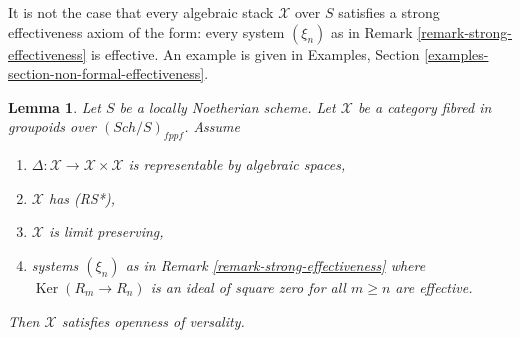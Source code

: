 \documentclass{stacks-project}
\theoremstyle{plain}
\newtheorem{lemma}[subsection]{Lemma}
\theoremstyle{definition}
\theoremstyle{remark}
\numberwithin{equation}{subsection}
\def\Sch{\mathit{Sch}}
\def\Ker{\mathop{\mathrm{Ker}}}
\begin{document}
\noindent
It is not the case that every algebraic stack $\mathcal{X}$
over $S$ satisfies a strong effectiveness axiom of the form:
every system $(\xi_n)$ as in Remark \ref{remark-strong-effectiveness}
is effective. An example is given in
Examples, Section \ref{examples-section-non-formal-effectiveness}.

\begin{lemma}
\label{lemma-SGE-implies-openness-versality}
Let $S$ be a locally Noetherian scheme. Let $\mathcal{X}$ be a category fibred
in groupoids over $(\Sch/S)_{fppf}$. Assume
\begin{enumerate}
\item $\Delta : \mathcal{X} \to \mathcal{X} \times \mathcal{X}$ is
representable by algebraic spaces,
\item $\mathcal{X}$ has (RS*),
\item $\mathcal{X}$ is limit preserving,
\item systems $(\xi_n)$ as in Remark \ref{remark-strong-effectiveness}
where $\Ker(R_m \to R_n)$ is an ideal of square zero for all $m \geq n$
are effective.
\end{enumerate}
Then $\mathcal{X}$ satisfies openness of versality.
\end{lemma}
\end{document}
